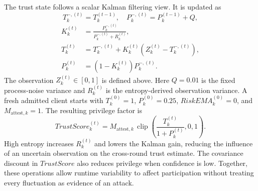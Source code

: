 \documentclass[runningheads,orivec]{llncs}
\begin{document}
The trust state follows a scalar Kalman filtering view. It is updated as
\begin{equation}
    T_{k}^{-,(t)}=T_k^{(t-1)},\quad P_{k}^{-,(t)}=P_k^{(t-1)}+Q,
\end{equation}
\begin{equation}
\begin{aligned}
    K_k^{(t)}&=\frac{P_k^{-,(t)}}{P_k^{-,(t)}+R_k^{(t)}},\\
    T_k^{(t)}&=T_k^{-,(t)}+K_k^{(t)}(Z_k^{(t)}-T_k^{-,(t)}),\\
    P_k^{(t)}&=(1-K_k^{(t)})P_k^{-,(t)}.
\end{aligned}
\end{equation}
The observation $Z_k^{(t)}\in[0,1]$ is defined above. Here $Q=0.01$ is the fixed process-noise variance and $R_k^{(t)}$ is the entropy-derived observation variance. A fresh admitted client starts with $T_k^{(0)}=1$, $P_k^{(0)}=0.25$, $RiskEMA_k^{(0)}=0$, and $M_{\text{attest},k}=1$. The resulting privilege factor is
\begin{equation}
    TrustScore_k^{(t)}=M_{\text{attest},k}\,\operatorname{clip}\!\left(\frac{T_k^{(t)}}{1+P_k^{(t)}},0,1\right).
\end{equation}
High entropy increases $R_k^{(t)}$ and lowers the Kalman gain, reducing the influence of an uncertain observation on the cross-round trust estimate. The covariance discount in $TrustScore$ also reduces privilege when confidence is low. Together, these operations allow runtime variability to affect participation without treating every fluctuation as evidence of an attack.
\end{document}
